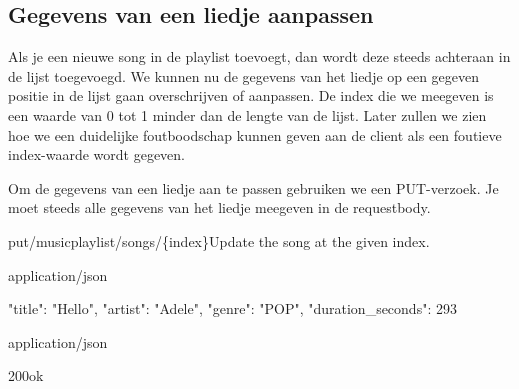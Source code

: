 \subsection{Gegevens van een liedje aanpassen}

Als je een nieuwe song in de playlist toevoegt, dan wordt deze steeds achteraan in de lijst toegevoegd. We kunnen nu de gegevens van het liedje op een gegeven positie in de lijst gaan overschrijven of aanpassen.  De index die we meegeven is een waarde van 0 tot 1 minder dan de lengte van de lijst.  Later zullen we zien hoe we een duidelijke foutboodschap kunnen geven aan de client als een foutieve index-waarde wordt gegeven.

Om de gegevens van een liedje aan te passen gebruiken we een PUT-verzoek. 
Je moet steeds alle gegevens van het liedje meegeven in de requestbody. 

\begin{apiRoute}{put}{/musicplaylist/songs/\{index\}}{Update the song at the given index.}
\begin{routeParameter}
\end{routeParameter}
\begin{routeRequest}{application/json}
\begin{routeRequestBody}
{
		"title": "Hello",
		"artist": "Adele",
		"genre": "POP",
		"duration_seconds": 293
}
\end{routeRequestBody}
\end{routeRequest}
\begin{routeResponse}{application/json}
\begin{routeResponseItem}{200}{ok}
\end{routeResponseItem}
\end{routeResponse}
\end{apiRoute}


